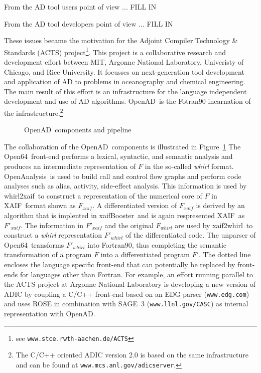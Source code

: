 \documentclass[acmtocl,acmnow]{acmtrans2m}
\newcommand{\OpenAD}{OpenAD}
\newcommand{\OpenSixtyFour}{Open64}
\newcommand{\OpenAnalysis}{OpenAnalysis}
\newcommand{\XAIF}{XAIF}
\newcommand{\xaifBooster}{xaifBooster}
\newcommand{\whirlToxaif}{whirl2xaif}
\newcommand{\xaifTowhirl}{xaif2whirl}
\newcommand{\reffig}[1]{Figure~\ref{#1}}
\begin{document}
From  the AD tool  users point of view ... FILL IN

From the AD tool developers point of view ... FILL IN

These issues became the motivation for the 
Adjoint Compiler Technology \& Standards (ACTS) project\footnote{ 
see {\tt www.stce.rwth-aachen.de/ACTS}
}. 
This project is a collaborative
research and development effort between MIT, Argonne National Laboratory, 
Univeristy of Chicago, and Rice University. 
It focusses on  next-generation tool development and 
application of AD to problems in oceanography and chemical engineering.
The main result of this effort is an infrastructure for the language independent 
development and use of AD algorithms. 
\OpenAD\ is the Fotran90 incarnation of the infrastructure.\footnote{
The C/C++ oriented ADIC version 2.0 is based on the same infrastructure and can be found
at {\tt www.mcs.anl.gov/adicserver}.
}
\begin{figure}[htb]
\centerline{ 
}
\caption{\OpenAD\ components and pipeline} \label{fig:overview}
\end{figure}
The collaboration  of the \OpenAD\  components is illustrated in 
\reffig{fig:overview}
The \OpenSixtyFour\ front-end performs a lexical, 
syntactic, and semantic analysis and produces an 
intermediate representation of $F$ in the so-called {\em whirl} format.
\OpenAnalysis\ is used to build call and control flow graphs and  perform 
code analyses such as alias, activity, side-effect analysis.
This information is used by 
\whirlToxaif\ to construct a representation of the numerical core of $F$ in
\XAIF\ format shown as $F_{xaif}$.  
A differentiated version of $F_{xaif}$ is derived by an 
algorithm that is implented in \xaifBooster\ and is again respresented 
\XAIF\ as $F'_{xaif}$.
The information in $F'_{xaif}$ and the original $F_{whirl}$ are used by 
\xaifTowhirl\ to construct a 
{\em whirl} representation $F'_{whirl}$ of the differentiated code. 
The unparser of 
\OpenSixtyFour\ transforms $F'_{whirl}$ into Fortran90, thus completing
the semantic transformation of a program $F$ into
a differentiated program $F'$.
The dotted line encloses the language specific front-end that can potentially
be replaced by front-ends for languages other than Fortran. 
For example, an 
effort running parallel to the ACTS project at Argonne National Laboratory is 
developing a new version of ADIC \cite{HoNo01} by coupling a C/C++ 
front-end 
based on an EDG parser ({\tt www.edg.com}) and uses ROSE in combination with SAGE~3 ({\tt www.llnl.gov/CASC}) as internal representation
with \OpenAD.
\end{document}
